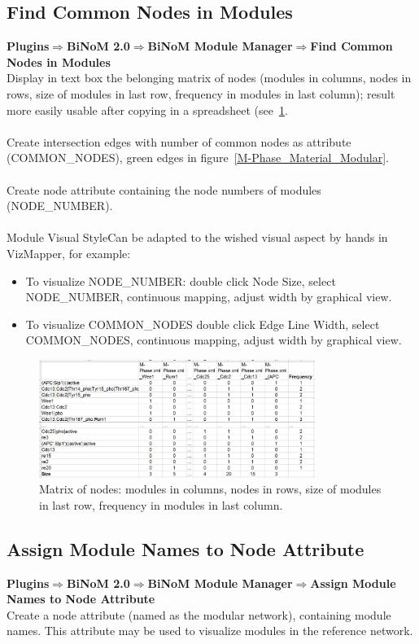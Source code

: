 \subsection{Find Common Nodes in Modules}
\textbf{Plugins$\Rightarrow$BiNoM 2.0$\Rightarrow$BiNoM Module Manager$\Rightarrow$Find Common Nodes in Modules}\\
Display in text box the belonging matrix of nodes (modules in columns, nodes in rows, size of modules in last row, frequency in modules in last column); result more easily usable after copying in a spreadsheet (see~\ref{Common_nodes_in_modules}.\\\\
Create intersection edges with number of common nodes as attribute (COMMON\_NODES), green edges in figure~\ref{M-Phase_Material_Modular}.\\\\
Create node attribute containing the node numbers of modules (NODE\_NUMBER).\\\\
Module Visual StyleCan be adapted to the wished visual aspect by hands in VizMapper, for example:
\begin{itemize}
\item To visualize NODE\_NUMBER: double click Node Size, select NODE\_NUMBER, continuous mapping, adjust width by graphical view.
\item To visualize COMMON\_NODES double click Edge Line Width, select COMMON\_NODES, continuous mapping, adjust width by graphical view.
\end{itemize}
\begin{figure}
\centering
\includegraphics[width=0.8\textwidth]{graphics/Common_nodes_in_modules}
\caption{Matrix of nodes: modules in columns, nodes in rows, size of modules in last row, frequency in modules in last column.}
\label{Common_nodes_in_modules}
\end{figure}

\subsection{Assign Module Names to Node Attribute}
\textbf{Plugins$\Rightarrow$BiNoM 2.0$\Rightarrow$BiNoM Module Manager$\Rightarrow$Assign Module Names to Node Attribute}\\
Create a node attribute (named as the modular network), containing module names. This attribute may be used to visualize modules in the reference network.

